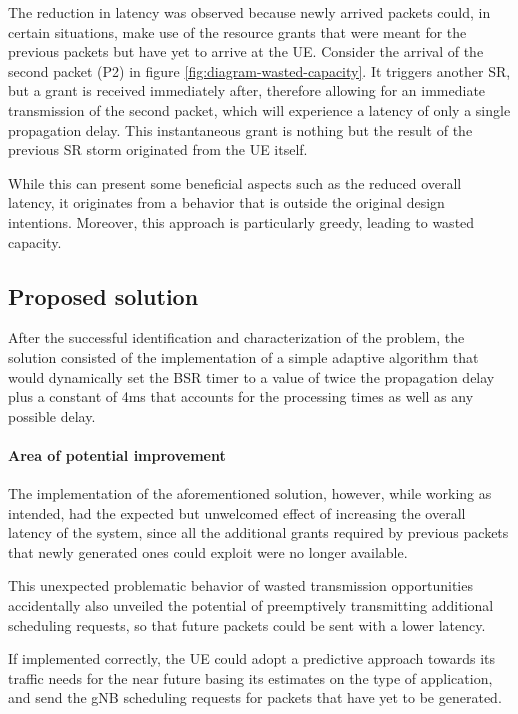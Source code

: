The reduction in latency was observed because newly arrived packets could, in certain situations, make use of the resource grants that were meant for the previous packets but have yet to arrive at the \ac{UE}. Consider the arrival of the second packet (P2) in figure \ref{fig:diagram-wasted-capacity}. It triggers another \ac{SR}, but a grant is received immediately after, therefore allowing for an immediate transmission of the second packet, which will experience a latency of only a single propagation delay. This instantaneous grant is nothing but the result of the previous \ac{SR} storm originated from the \ac{UE} itself.

While this can present some beneficial aspects such as the reduced overall latency, it originates from a behavior that is outside the original design intentions. Moreover, this approach is particularly greedy, leading to wasted capacity.

\subsection{Proposed solution}

After the successful identification and characterization of the problem, the  solution consisted of the implementation of a simple adaptive algorithm that would dynamically set the \ac{BSR} timer to a value of twice the propagation delay plus a constant of 4ms that accounts for the processing times as well as any possible delay.

\paragraph{Area of potential improvement}
The implementation of the aforementioned solution, however, while working as intended, had the expected but unwelcomed effect of increasing the overall latency of the system, since all the additional grants required by previous packets that newly generated ones could exploit were no longer available.

This unexpected problematic behavior of wasted transmission opportunities accidentally also unveiled the potential of preemptively transmitting additional scheduling requests, so that future packets could be sent with a lower latency.

If implemented correctly, the \ac{UE} could adopt a predictive approach towards its traffic needs for the near future basing its estimates on the type of application, and send the \ac{gNB} scheduling requests for packets that have yet to be generated.

